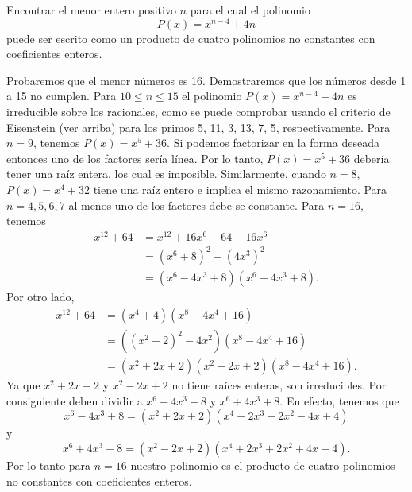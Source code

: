 \begin{example}
    Encontrar el menor entero positivo $n$ para el cual el polinomio
    \[
        P(x) = x^{n - 4} + 4n
    \]
    puede ser escrito como un producto de cuatro polinomios no constantes con coeficientes enteros.
\end{example}
\begin{solution}
    Probaremos que el menor números es 16.
    Demostraremos que los números desde 1 a 15 no cumplen.
    Para $10 \leq n \leq 15$ el polinomio $P(x) = x^{n - 4} + 4n$ es irreducible sobre los racionales, como se puede comprobar usando el criterio de Eisenstein (ver arriba) para los primos 5, 11, 3, 13, 7, 5, respectivamente.
    Para $n = 9$, tenemos $P(x) = x^5 +36$.
    Si podemos factorizar en la forma deseada entonces uno de los factores sería línea.
    Por lo tanto, $P(x) = x^5 + 36$ debería tener una raíz entera, los cual es imposible.
    Similarmente, cuando $n = 8$, $P(x) = x^4 + 32$ tiene una raíz entero e implica el mismo razonamiento.
    Para $n = 4, 5, 6, 7$ al menos uno de los factores debe se constante.
    Para $n = 16$, tenemos
    \begin{align*}
        x^{12} + 64 & = x^{12} + 16x^6 + 64 - 16x^6\\
        & = (x^6 + 8)^2 - (4x^3)^2\\
        & = (x^6 - 4x^3 + 8)(x^6 + 4x^3 + 8).
    \end{align*}
    Por otro lado,
    \begin{align*}
        x^{12} + 64 &= (x^4 + 4)(x^8 - 4x^4 + 16)\\
        &= \left((x^2 + 2)^2 - 4x^2\right)(x^8 - 4x^4 + 16)\\
        &= (x^2 + 2x + 2)(x^2 - 2x + 2)(x^8 - 4x^4 + 16).
    \end{align*}
    Ya que $x^2 + 2x + 2$ y $x^2 - 2x + 2$ no tiene raíces enteras, son irreducibles.
    Por consiguiente deben dividir a $x^6 - 4x^3 + 8$ y $x^6 + 4x^3 + 8$.
    En efecto, tenemos que
    \[
        x^6 - 4x^3 + 8 = (x^2 + 2x + 2)(x^4 - 2x^3 + 2x^2 - 4x + 4)
    \]
    y
    \[
        x^6 + 4x^3 + 8 = (x^2 - 2x + 2)(x^4 + 2x^3 + 2x^2 + 4x + 4).
    \]
    Por lo tanto para $n = 16$ nuestro polinomio es el producto de cuatro polinomios no constantes con coeficientes enteros.
\end{solution}

